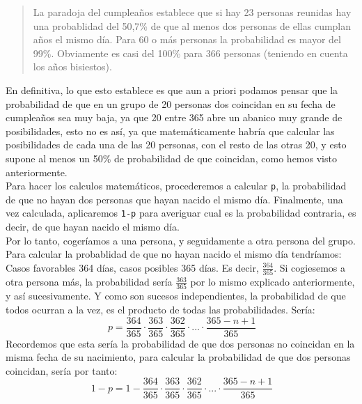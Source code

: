 \documentclass[a4paper]{article}
\begin{document}
\begin{quote}
La paradoja del cumpleaños establece que si hay 23 personas reunidas hay una probablidad del 50,7\% de que al menos dos personas de ellas cumplan años el mismo día. Para 60 o más personas la probabilidad es mayor del 99\%. Obviamente es casi del 100\% para 366 personas (teniendo en cuenta los años bisiestos).
\end{quote}
En definitiva, lo que esto establece es que aun a priori podamos pensar que la probabilidad de que en un grupo de 20 personas dos coincidan en su fecha de cumpleaños sea muy baja, ya que 20 entre 365 abre un abanico muy grande de posibilidades, esto no es así, ya que matemáticamente habría que calcular las posibilidades de cada una de las 20 personas, con el resto de las otras 20, y esto supone al menos un 50\% de probabilidad de que coincidan, como hemos visto anteriormente.\\
Para hacer los calculos matemáticos, procederemos a calcular \texttt{p}, la probabilidad de que no hayan dos personas que hayan nacido el mismo día. Finalmente, una vez calculada, aplicaremos \texttt{1-p} para averiguar cual es la probabilidad contraria, es decir, de que hayan nacido el mismo día.\\
Por lo tanto, cogeríamos a una persona, y seguidamente a otra persona del grupo. Para calcular la probablidad de que no hayan nacido el mismo día tendríamos: Casos favorables 364 días, casos posibles 365 días. Es decir, $\frac{364}{365} $. Si cogiesemos a otra persona más, la probabilidad sería $\frac{363}{365} $ por lo mismo explicado anteriormente, y así sucesivamente. Y como son sucesos independientes, la probabilidad de que todos ocurran a la vez, es el producto de todas las probabilidades. Sería:
\[
\ p = \frac{364}{365} \cdot \frac{363}{365} \cdot \frac{362}{365} \cdot ... \cdot  \frac{365-n+1}{365}
\]
Recordemos que esta sería la probabilidad de que dos personas no coincidan en la misma fecha de su nacimiento, para calcular la probabilidad de que dos personas coincidan, sería por tanto:
\[
\ 1-p = 1 - \frac{364}{365} \cdot \frac{363}{365} \cdot \frac{362}{365} \cdot ... \cdot  \frac{365-n+1}{365}
\]
\end{document}
